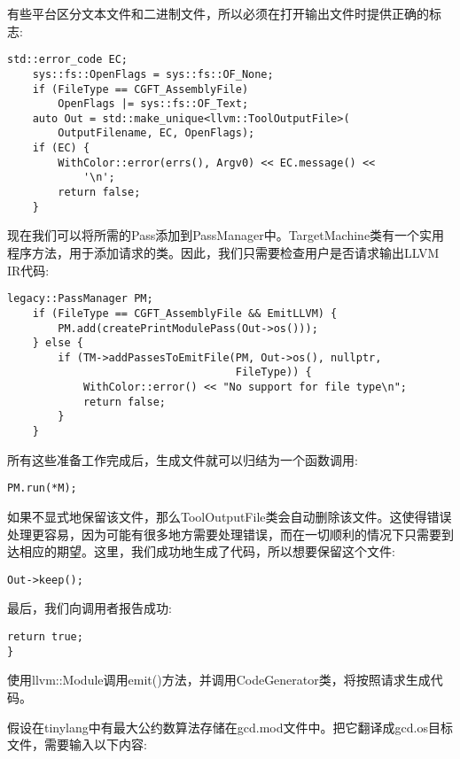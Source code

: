 有些平台区分文本文件和二进制文件，所以必须在打开输出文件时提供正确的标志:\par

\begin{lstlisting}[caption={}]
	std::error_code EC;
	sys::fs::OpenFlags = sys::fs::OF_None;
	if (FileType == CGFT_AssemblyFile)
		OpenFlags |= sys::fs::OF_Text;
	auto Out = std::make_unique<llvm::ToolOutputFile>(
		OutputFilename, EC, OpenFlags);
	if (EC) {
		WithColor::error(errs(), Argv0) << EC.message() <<
			'\n';
		return false;
	}
\end{lstlisting}

现在我们可以将所需的Pass添加到PassManager中。TargetMachine类有一个实用程序方法，用于添加请求的类。因此，我们只需要检查用户是否请求输出LLVM IR代码:\par

\begin{lstlisting}[caption={}]
	legacy::PassManager PM;
	if (FileType == CGFT_AssemblyFile && EmitLLVM) {
		PM.add(createPrintModulePass(Out->os()));
	} else {
		if (TM->addPassesToEmitFile(PM, Out->os(), nullptr,
									FileType)) {
			WithColor::error() << "No support for file type\n";
			return false;
		}
	}
\end{lstlisting}

所有这些准备工作完成后，生成文件就可以归结为一个函数调用:\par

\begin{lstlisting}[caption={}]
	PM.run(*M);
\end{lstlisting}

如果不显式地保留该文件，那么ToolOutputFile类会自动删除该文件。这使得错误处理更容易，因为可能有很多地方需要处理错误，而在一切顺利的情况下只需要到达相应的期望。这里，我们成功地生成了代码，所以想要保留这个文件:\par

\begin{lstlisting}[caption={}]
	Out->keep();
\end{lstlisting}

最后，我们向调用者报告成功:\par

\begin{lstlisting}[caption={}]
	return true;
}
\end{lstlisting}

使用llvm::Module调用emit()方法，并调用CodeGenerator类，将按照请求生成代码。\par

假设在tinylang中有最大公约数算法存储在gcd.mod文件中。把它翻译成gcd.os目标文件，需要输入以下内容:\par


